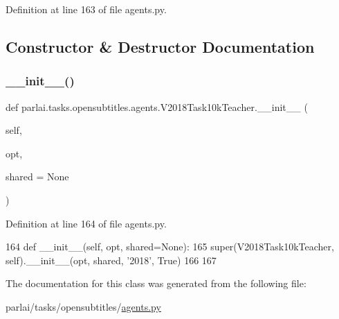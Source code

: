 Definition at line 163 of file agents.\+py.



\subsection{Constructor \& Destructor Documentation}
\mbox{\label{classparlai_1_1tasks_1_1opensubtitles_1_1agents_1_1V2018Task10kTeacher_af6e78685bc810f960b3d35b1dd1bf281}} 
\subsubsection{\texorpdfstring{\+\_\+\+\_\+init\+\_\+\+\_\+()}{\_\_init\_\_()}}
{\footnotesize\ttfamily def parlai.\+tasks.\+opensubtitles.\+agents.\+V2018\+Task10k\+Teacher.\+\_\+\+\_\+init\+\_\+\+\_\+ (\begin{DoxyParamCaption}\item[{}]{self,  }\item[{}]{opt,  }\item[{}]{shared = {\ttfamily None} }\end{DoxyParamCaption})}



Definition at line 164 of file agents.\+py.


\begin{DoxyCode}
164     \textcolor{keyword}{def }\_\_init\_\_(self, opt, shared=None):
165         super(V2018Task10kTeacher, self).\_\_init\_\_(opt, shared, \textcolor{stringliteral}{'2018'}, \textcolor{keyword}{True})
166 
167 
\end{DoxyCode}


The documentation for this class was generated from the following file\+:\begin{DoxyCompactItemize}
\item 
parlai/tasks/opensubtitles/\hyperlink{parlai_2tasks_2opensubtitles_2agents_8py}{agents.\+py}\end{DoxyCompactItemize}
